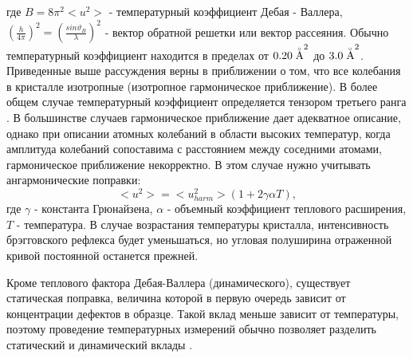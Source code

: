  где $B = 8 \pi^2 <u^2>$ - температурный коэффициент Дебая - Валлера,
 $(\frac{h}{4\pi})^2=(\frac{sin\vartheta_B}{\lambda})^2$ -
 вектор обратной решетки или вектор рассеяния. Обычно температурный коэффициент
 находится в пределах от $0.20 \angstrom ^2$ до $3.0 \angstrom ^2$.
 Приведенные выше рассуждения верны в приближении о том, что все колебания в кристалле изотропные
 (изотропное гармоническое приближение). В более общем случае
 температурный коэффициент определяется тензором третьего ранга \cite{Willis1975}.
 В большинстве случаев гармоническое приближение дает адекватное описание, однако при описании
 атомных колебаний в области высоких температур, когда амплитуда колебаний сопоставима с расстоянием
 между соседними атомами, гармоническое приближение некорректно. В этом случае нужно учитывать ангармонические
 поправки:
 \begin{equation}
 <u^2> = <u^2_{harm}> (1+2\gamma \alpha T),
\end{equation}
\noindent
где $\gamma$ - константа Грюнайзена, $\alpha$ - объемный коэффициент теплового расширения, $T$ - температура.
В случае возрастания температуры кристалла, интенсивность брэгговского рефлекса будет уменьшаться,
но угловая полуширина отраженной кривой постоянной останется прежней.

 Кроме теплового фактора Дебая-Валлера (динамического), существует статическая поправка,
 величина которой в первую очередь зависит от концентрации дефектов в образце.
 Такой вклад меньше зависит от температуры, поэтому проведение температурных измерений
 обычно позволяет разделить статический и динамический вклады \cite{kibalin2015}.


%

%
